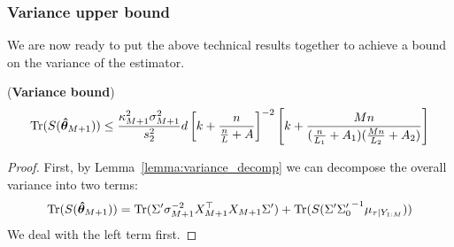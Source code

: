 \subsubsection{Variance upper bound}
We are now ready to put the above technical results together to achieve a bound on the variance of the estimator. 

\begin{lemma}(\textbf{Variance bound})\label{lemma:variance_ubound}
\[ \mathrm{Tr}(S(\bm{\hat{\theta}}_{M+1})) \le \frac{\kappa_{M+1}^2 \sigma_{M+1}^2}{s_2^2} d \left[ {k} + \frac{{n}}{\frac{{n}}{L} + A} \right]^{-2} 
\left[ {k} + \frac{M{n}}{ 
(\frac{{n}}{L_1} + A_1 ) 
(\frac{M{n}}{L_2} + A_2)} \right] \]
\end{lemma}

\begin{proof}
First, by Lemma~\ref{lemma:variance_decomp} we can decompose the overall variance into two terms:
\[\mathrm{Tr}(S(\bm{\hat{\theta}}_{M+1})) = \mathrm{Tr}({\Sigma'} \sigma_{M+1}^{-2} X_{M+1}^\top X_{M+1} {\Sigma'}) + \mathrm{Tr}(S({\Sigma'} {{\Sigma'_{0}}}^{-1} \mu_{\tau \vert Y_{1:M}})) \]
We deal with the left term first.


\end{proof}
